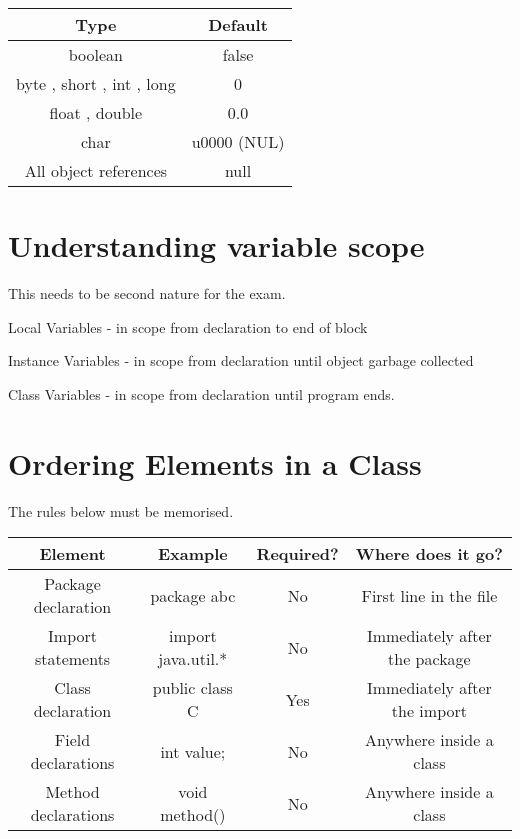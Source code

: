 \documentclass[a4paper]{report}   %
\begin{document}
\begin{center}
\begin{tabular}{| c | c |}
 \hline
 Type & Default\\ 
 \hline
 boolean & false\\  
 byte , short , int , long & 0\\  
 float , double & 0.0\\
 char & u0000 (NUL)\\
 All object references & null \\ 
 \hline
\end{tabular}
\end{center}

\section{Understanding variable scope}

This needs to be second nature for the exam.

\begin{list}{•}{•}
\item Local Variables - in scope from declaration to end of block
\item Instance Variables - in scope from declaration until object garbage collected 
\item Class Variables - in scope from declaration until program ends.
\end{list}

\section{Ordering Elements in a Class}

The rules below must be memorised.

\begin{center}
\begin{tabular}{| c | c | c | c |}
 \hline
 Element & Example & Required? & Where does it go?\\
 \hline
 Package declaration & package abc & No & First line in the file\\
 
 Import statements & import java.util.* & No & Immediately after the package\\  
 Class declaration & public class C & Yes & Immediately after the import\\
 Field declarations & int value; & No & Anywhere inside a class\\
 Method declarations & void method() & No & Anywhere inside a class \\ 
 \hline
\end{tabular}
\end{center}
\end{document}

